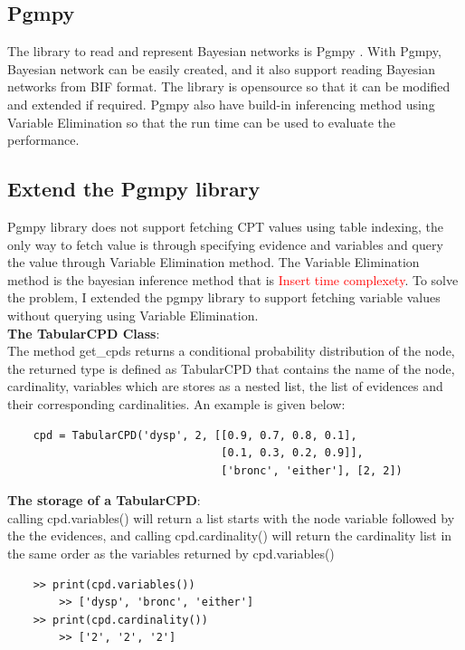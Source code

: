 
\subsection{Pgmpy}
The library to read and represent Bayesian networks is Pgmpy \cite{pgmpy_paper}. With Pgmpy, Bayesian network can be easily created, and it also support reading Bayesian networks from BIF format. The library is opensource so that it can be modified and extended if required. Pgmpy also have build-in inferencing method using Variable Elimination so that the run time can be used to evaluate the performance. 

 \subsection{Extend the Pgmpy library}
    Pgmpy library does not support fetching CPT values using table indexing, the only way to fetch value is through specifying evidence and variables and query the value through Variable Elimination method. The Variable Elimination method is the bayesian inference method that is \textcolor{red}{Insert time complexety}. To solve the problem, I extended the pgmpy library to support fetching variable values without querying using Variable Elimination.\\

    \noindent \textbf{The TabularCPD Class}:\\
    The method get\_cpds returns a conditional probability distribution of the node, the returned type is defined as TabularCPD that contains the name of the node, cardinality, variables which are stores as a nested list, the list of evidences and their corresponding cardinalities. An example is given below:
    \begin{lstlisting}
    cpd = TabularCPD('dysp', 2, [[0.9, 0.7, 0.8, 0.1],
                                 [0.1, 0.3, 0.2, 0.9]],
                                 ['bronc', 'either'], [2, 2])
    \end{lstlisting}

    \noindent \textbf{The storage of a TabularCPD}:\\
    calling cpd.variables() will return a list starts with the node variable followed by the the evidences, and calling cpd.cardinality() will return the cardinality list in the same order as the variables returned by cpd.variables()
    \begin{lstlisting}
    >> print(cpd.variables())
        >> ['dysp', 'bronc', 'either']
    >> print(cpd.cardinality())
        >> ['2', '2', '2']
    \end{lstlisting}

